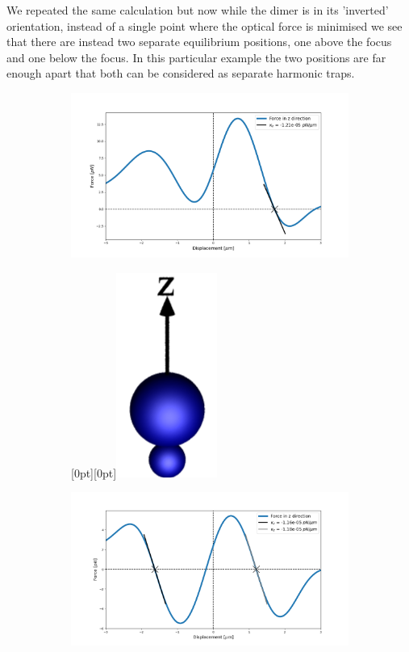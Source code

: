We repeated the same calculation but now while the dimer is in its 'inverted' 
orientation, instead of a single point where the optical force is minimised we 
see that there are instead two separate equilibrium positions, one above the focus
and one below the focus. In this particular example the two positions are far enough
apart that both can be considered as separate harmonic traps.    
\begin{figure}[h!]
	\centering
	\begin{subfigure}{.65\linewidth}
		\includegraphics[width=\linewidth]{lam=2_theta=0.png}
		\caption{}
		\label{lam=2}
	\end{subfigure}\hfill %
	\begin{subfigure}{.25\linewidth}
		\centering
		\raisebox{60pt}[0pt][0pt]{\makebox{}\includegraphics[width=0.3\linewidth, keepaspectratio]{theta=0.png}}
		\label{large over small}
	\end{subfigure}
	\medskip
	\begin{subfigure}{.65\linewidth}
		\includegraphics[width=\linewidth]{lam=2_theta=180.png}

\end{subfigure}
\end{figure}
